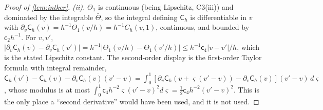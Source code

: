 \begin{proof}[Proof of \cref{lem:intker}]
\emph{(ii).} $\Theta_1$ is continuous (being Lipschitz, C3(iii)) and dominated by the integrable
$\bar\Theta$, so the
integral defining $\mathsf C_h$ is differentiable in $v$ with
$\partial_v\mathsf C_h(v)=h^{-1}\Theta_1(v/h)=h^{-1}C_h(v,1)$, continuous, and bounded by
$\mathsf c_2h^{-1}$. For $v,v'$,
$|\partial_v\mathsf C_h(v)-\partial_v\mathsf C_h(v')|=h^{-1}|\Theta_1(v/h)-\Theta_1(v'/h)|
\le h^{-1}\mathsf c_4|v-v'|/h$, which is the stated Lipschitz constant. The second-order display is
the first-order Taylor formula with integral remainder,
$\mathsf C_h(v')-\mathsf C_h(v)-\partial_v\mathsf C_h(v)(v'-v)
=\int_0^1[\partial_v\mathsf C_h(v+\varsigma(v'-v))-\partial_v\mathsf C_h(v)](v'-v)\,d\varsigma$,
whose modulus is at most
$\int_0^1\mathsf c_4h^{-2}\varsigma(v'-v)^2d\varsigma=\tfrac12\mathsf c_4h^{-2}(v'-v)^2$.
This is the only place a ``second derivative'' would have been used, and it is not used.


\end{proof}
